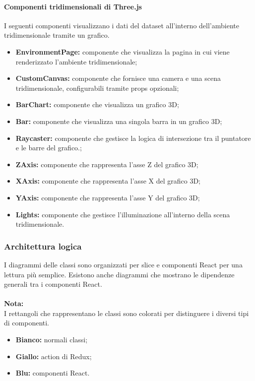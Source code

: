 \paragraph{Componenti tridimensionali di Three.js}
    I seguenti componenti visualizzano i dati del dataset all'interno dell'ambiente tridimensionale tramite un grafico.
    \begin{itemize}
        \item \textbf{EnvironmentPage:} componente che visualizza la pagina in cui viene renderizzato l'ambiente tridimensionale;
        \item \textbf{CustomCanvas:} componente che fornisce una camera e una scena tridimensionale, configurabili tramite props opzionali;
        \item \textbf{BarChart:} componente che visualizza un grafico 3D;
        \item \textbf{Bar:} componente che visualizza una singola barra in un grafico 3D;
        \item \textbf{Raycaster:} componente che gestisce la logica di intersezione tra il puntatore e le barre del grafico.;
        \item \textbf{ZAxis:} componente che rappresenta l'asse Z del grafico 3D;
        \item \textbf{XAxis:} componente che rappresenta l'asse X del grafico 3D;
        \item \textbf{YAxis:} componente che rappresenta l'asse Y del grafico 3D;
        \item \textbf{Lights:} componente che gestisce l'illuminazione all'interno della scena tridimensionale.
    \end{itemize}

\subsubsection{Architettura logica}
I diagrammi delle classi sono organizzati per slice e componenti React per una lettura più semplice. 
Esistono anche diagrammi che mostrano le dipendenze generali tra i componenti React.\\\\
\textbf{Nota:}\\
I rettangoli che rappresentano le classi sono colorati per distinguere i diversi tipi di componenti.
\begin{itemize}
    \item \textbf{Bianco:} normali classi;
    \item \textbf{Giallo:} action di Redux;
    \item \textbf{Blu:} componenti React.
\end{itemize}


